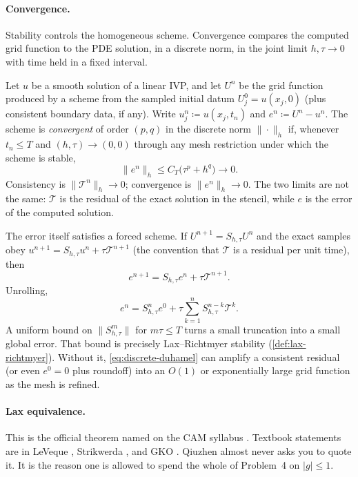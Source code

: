 \documentclass[11pt,a4paper]{article}
\begin{document}
\paragraph{Convergence.}

Stability controls the homogeneous scheme. Convergence compares the computed grid function to the PDE solution, in a discrete norm, in the joint limit \(h,\tau\to 0\) with time held in a fixed interval.

\begin{definition}[Convergence]
\label{def:convergence}
Let \(u\) be a smooth solution of a linear IVP, and let \(U^n\) be the grid function produced by a scheme from the sampled initial datum \(U^0_j=u(x_j,0)\) (plus consistent boundary data, if any). Write \(u^n_j\coloneqq u(x_j,t_n)\) and \(e^n\coloneqq U^n-u^n\). The scheme is \emph{convergent} of order \((p,q)\) in the discrete norm \(\|\cdot\|_h\) if, whenever \(t_n\le T\) and \((h,\tau)\to(0,0)\) through any mesh restriction under which the scheme is stable,
\[
\|e^n\|_h
\le
C_T\bigl(\tau^p+h^q\bigr)
\to 0.
\]
Consistency is \(\|\mathcal T^n\|_h\to 0\); convergence is \(\|e^n\|_h\to 0\). The two limits are not the same: \(\mathcal T\) is the residual of the exact solution in the stencil, while \(e\) is the error of the computed solution.
\end{definition}

The error itself satisfies a forced scheme. If \(U^{n+1}=S_{h,\tau}U^n\) and the exact samples obey \(u^{n+1}=S_{h,\tau}u^n+\tau\mathcal T^{n+1}\) (the convention that \(\mathcal T\) is a residual per unit time), then
\[
e^{n+1}
=
S_{h,\tau}e^n
+
\tau\mathcal T^{n+1}.
\]
Unrolling,
\begin{equation}
\label{eq:discrete-duhamel}
e^n
=
S_{h,\tau}^n e^0
+
\tau\sum_{k=1}^{n} S_{h,\tau}^{n-k}\mathcal T^{k}.
\end{equation}
A uniform bound on \(\|S_{h,\tau}^m\|\) for \(m\tau\le T\) turns a small truncation into a small global error. That bound is precisely Lax--Richtmyer stability (\cref{def:lax-richtmyer}). Without it, \eqref{eq:discrete-duhamel} can amplify a consistent residual (or even \(e^0=0\) plus roundoff) into an \(O(1)\) or exponentially large grid function as the mesh is refined.

\paragraph{Lax equivalence.}

This is the official theorem named on the CAM syllabus \cite{laxrichtmyer56}. Textbook statements are in LeVeque \cite{leveque07}, Strikwerda \cite{strikwerda04}, and GKO \cite{gko95}. Qiuzhen almost never asks you to quote it. It is the reason one is allowed to spend the whole of Problem~4 on \(|g|\le 1\).
\end{document}
